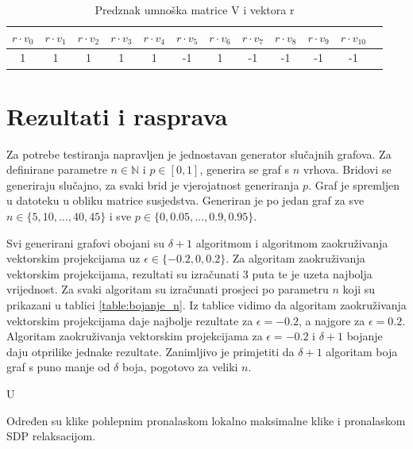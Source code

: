 \documentclass[diplomskirad]{fer}
\begin{document}
\begin{table}
  \caption{Predznak umnoška matrice V i vektora r}
  \label{table_clique_sign}
  \begin{tabular}{|c|c|c|c|c|c|c|c|c|c|c|c|}
    \hline
    $r \cdot v_0$ & $r \cdot v_1$ & $r \cdot v_2$ & $r \cdot v_3$ & $r \cdot v_4$ & $r \cdot v_5$ & $r \cdot v_6$ & $r \cdot v_7$ & $r \cdot v_8$ & $r \cdot v_9$ & $r \cdot v_{10}$ \\
    \hline
    \hline
    1 & 1 & 1 & 1 & 1 & -1 & 1 & -1 & -1 & -1 & -1 \\
    \hline
  \end{tabular}
\end{table}

\chapter{Rezultati i rasprava}
\label{pog:rezultati_i_rasprava}

Za potrebe testiranja napravljen je jednostavan generator slučajnih grafova. Za definirane parametre $n \in \mathbb{N}$ i $p \in [0,1]$, generira
se graf s $n$ vrhova. Bridovi se generiraju slučajno, za svaki brid je vjerojatnost generiranja $p$. Graf je spremljen u datoteku u obliku 
matrice susjedstva. Generiran je po jedan graf za sve $n \in \{5, 10, \dots, 40, 45\}$ i sve $p \in \{0, 0.05, \dots, 0.9, 0.95\}$.

Svi generirani grafovi obojani su $\delta + 1$ algoritmom i algoritmom zaokruživanja vektorskim projekcijama uz $\epsilon \in \{-0.2, 0, 0.2\}$.
Za algoritam zaokruživanja vektorskim projekcijama, rezultati su izračunati 3 puta te je uzeta najbolja vrijednost. Za svaki algoritam su izračunati prosjeci po
parametru $n$ koji su prikazani u tablici \ref{table:bojanje_n}. Iz tablice vidimo da algoritam zaokruživanja vektorskim projekcijama daje najbolje rezultate za $\epsilon = -0.2$, a
najgore za $\epsilon = 0.2$. Algoritam zaokruživanja vektorskim projekcijama za $\epsilon = -0.2$ i $\delta + 1$ bojanje daju otprilike jednake rezultate. Zanimljivo je primjetiti
da $\delta + 1$ algoritam boja graf s puno manje od $\delta$ boja, pogotovo za veliki $n$.

U

Određen su klike pohlepnim pronalaskom lokalno maksimalne klike i pronalaskom SDP relaksacijom. 
\end{document}
